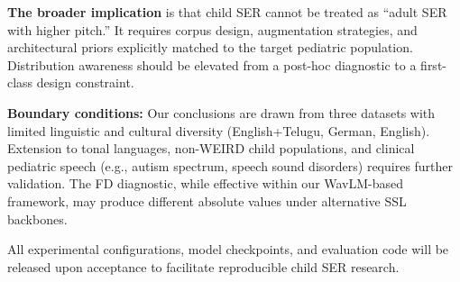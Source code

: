 \documentclass[11pt,a4paper]{article}
\begin{document}
\textbf{The broader implication} is that child SER cannot be treated as ``adult
SER with higher pitch.'' It requires corpus design, augmentation strategies,
and architectural priors explicitly matched to the target pediatric population.
Distribution awareness should be elevated from a post-hoc diagnostic to a
first-class design constraint.

\textbf{Boundary conditions:} Our conclusions are drawn from three datasets
with limited linguistic and cultural diversity (English+Telugu, German, English).
Extension to tonal languages, non-WEIRD child populations, and clinical
pediatric speech (e.g., autism spectrum, speech sound disorders) requires
further validation. The FD diagnostic, while effective within our WavLM-based
framework, may produce different absolute values under alternative SSL
backbones.

All experimental configurations, model checkpoints, and evaluation code will be
released upon acceptance to facilitate reproducible child SER research.

\end{document}
